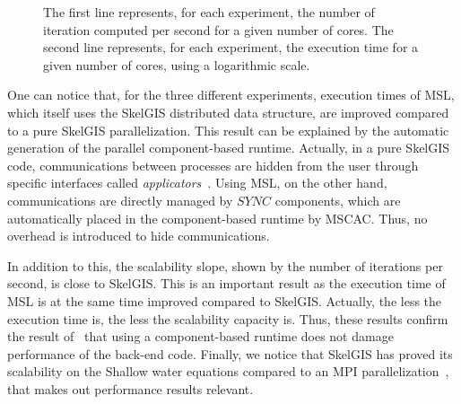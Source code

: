 \begin{figure}
\begin{center}
{
}
\end{center}
\caption{The first line represents, for each experiment, the number of iteration computed per second for a given number of cores. The second line represents, for each experiment, the execution time for a given number of cores, using a logarithmic scale.}
\label{fig:perfs}
\end{figure}

One can notice that, for the three different experiments, execution times of MSL, which itself uses the SkelGIS distributed data structure, are improved compared to a pure SkelGIS parallelization. This result can be explained by the automatic generation of the parallel component-based runtime. Actually, in a pure SkelGIS code, communications between processes are hidden from the user through specific interfaces called \emph{applicators}~\cite{CPE:CPE3494}. Using MSL, on the other hand, communications are directly managed by $SYNC$ components, which are automatically placed in the component-based runtime by MSCAC. Thus, no overhead is introduced to hide communications.

In addition to this, the scalability slope, shown by the number of iterations per second, is close to SkelGIS. This is an important result as the execution time of MSL is at the same time improved compared to SkelGIS. Actually, the less the execution time is, the less the scalability capacity is. Thus, these results confirm the result of~\cite{l2c} that using a component-based runtime does not damage performance of the back-end code. Finally, we notice that SkelGIS has proved its scalability on the Shallow water equations compared to an MPI parallelization~\cite{CPE:CPE3494}, that makes out performance results relevant. 
